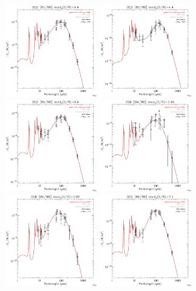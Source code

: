 \documentclass[preprint2,longabstract]{aastex}
\begin{document}
\begin{figure}
\centering
    \includegraphics[trim=0 2mm 0 0, clip, width=40mm]{../SEDs/sed_81.pdf}
	\includegraphics[trim=0 2mm 0 0, clip, width=40mm]{../SEDs/sed_82.pdf}
	\includegraphics[trim=0 2mm 0 0, clip, width=40mm]{../SEDs/sed_83.pdf}
	\includegraphics[trim=0 2mm 0 0, clip, width=40mm]{../SEDs/sed_84.pdf}
	\includegraphics[trim=0 2mm 0 0, clip, width=40mm]{../SEDs/sed_85.pdf}
	\includegraphics[trim=0 2mm 0 0, clip, width=40mm]{../SEDs/sed_86.pdf}

\end{figure}
\end{document}
